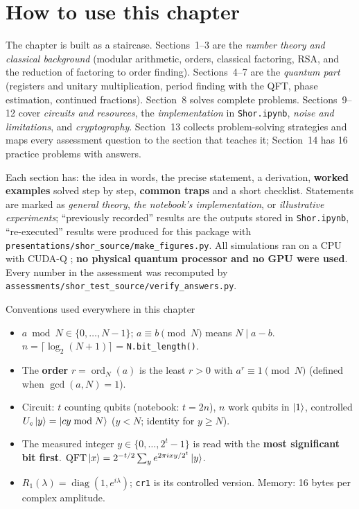 \documentclass[11pt,a4paper,openany]{book}
\begin{document}
\section*{How to use this chapter}
The chapter is built as a staircase. Sections~1--3 are the \emph{number theory and classical background} (modular arithmetic, orders,
classical factoring, RSA, and the reduction of factoring to order finding). Sections~4--7 are the \emph{quantum part} (registers and
unitary multiplication, period finding with the QFT, phase estimation, continued fractions). Section~8 solves complete problems.
Sections~9--12 cover \emph{circuits and resources}, the \emph{implementation} in \texttt{Shor.ipynb}, \emph{noise and limitations}, and
\emph{cryptography}. Section~13 collects problem-solving strategies and maps every assessment question to the section that teaches it;
Section~14 has 16 practice problems with answers.

Each section has: the idea in words, the precise statement, a derivation, \textbf{worked examples} solved step by step, \textbf{common traps}
and a short checklist. Statements are marked as \emph{general theory}, \emph{the notebook's implementation}, or \emph{illustrative
experiments}; ``previously recorded'' results are the outputs stored in \texttt{Shor.ipynb}, ``re-executed'' results were produced for this
package with \texttt{presentations/shor\_source/make\_figures.py}. All simulations ran on a CPU with CUDA-Q \numcudaqversion; \textbf{no
physical quantum processor and no GPU were used}. Every number in the assessment was recomputed by
\texttt{assessments/shor\_test\_source/verify\_answers.py}.

\begin{defn}{Conventions used everywhere in this chapter}
\begin{itemize}[leftmargin=1.2em, itemsep=1pt]
\item $a \bmod N \in \{0, \dots, N - 1\}$; $a \equiv b \pmod N$ means $N \mid a - b$. $n = \lceil\log_2(N + 1)\rceil$ = \texttt{N.bit\_length()}.
\item The \textbf{order} $r = \operatorname{ord}_N(a)$ is the least $r > 0$ with $a^r \equiv 1 \pmod N$ (defined when $\gcd(a, N) = 1$).
\item Circuit: $t$ counting qubits (notebook: $t = 2n$), $n$ work qubits in $\ket1$, controlled $U_c\ket y = \ket{cy \bmod N}$ ($y < N$; identity for $y \ge N$).
\item The measured integer $y \in \{0, \dots, 2^t - 1\}$ is read with the \textbf{most significant bit first}. $\mathrm{QFT}\ket x = 2^{-t/2}\sum_ye^{2\pi ixy/2^t}\ket y$.
\item $R_1(\lambda) = \operatorname{diag}(1, e^{i\lambda})$; \texttt{cr1} is its controlled version. Memory: 16 bytes per complex amplitude.
\end{itemize}
\end{defn}
\end{document}
